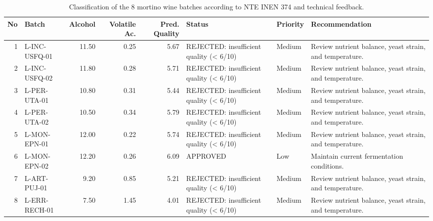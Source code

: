 \begin{table}
\centering
\begin{tabular}{rlrrrlll}
  \toprule
No & Batch & Alcohol & Volatile Ac. & Pred. Quality & Status & Priority & Recommendation \\ 
  \midrule
  1 & L-INC-USFQ-01 & 11.50 & 0.25 & 5.67 & REJECTED: insufficient quality (< 6/10) & Medium & Review nutrient balance, yeast strain, and temperature. \\ 
    2 & L-INC-USFQ-02 & 11.80 & 0.28 & 5.71 & REJECTED: insufficient quality (< 6/10) & Medium & Review nutrient balance, yeast strain, and temperature. \\ 
    3 & L-PER-UTA-01 & 10.80 & 0.31 & 5.44 & REJECTED: insufficient quality (< 6/10) & Medium & Review nutrient balance, yeast strain, and temperature. \\ 
    4 & L-PER-UTA-02 & 10.50 & 0.34 & 5.79 & REJECTED: insufficient quality (< 6/10) & Medium & Review nutrient balance, yeast strain, and temperature. \\ 
    5 & L-MON-EPN-01 & 12.00 & 0.22 & 5.74 & REJECTED: insufficient quality (< 6/10) & Medium & Review nutrient balance, yeast strain, and temperature. \\ 
    6 & L-MON-EPN-02 & 12.20 & 0.26 & 6.09 & APPROVED & Low & Maintain current fermentation conditions. \\ 
    7 & L-ART-PUJ-01 & 9.20 & 0.85 & 5.21 & REJECTED: insufficient quality (< 6/10) & Medium & Review nutrient balance, yeast strain, and temperature. \\ 
    8 & L-ERR-RECH-01 & 7.50 & 1.45 & 4.01 & REJECTED: insufficient quality (< 6/10) & Medium & Review nutrient balance, yeast strain, and temperature. \\ 
   \bottomrule
\end{tabular}
\caption{Classification of the 8 mortino wine batches according to NTE INEN 374 and technical feedback.} 
\label{tab:inen_en}
\end{table}
